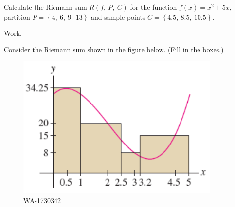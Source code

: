 \documentclass[12pt,addpoints, answers, fleqn]{exam}
\begin{document}
\begin{teacher}
\begin{questions}
\question 	%

Calculate the Riemann sum $R\left( f, \ P, \ C \right)$ for the function $f\left(x\right) = x^2 + 5x$, partition $P = \left\{ 4, \ 6, \ 9, \ 13 \right\}$ and sample points $C = \left\{ 4.5, \ 8.5, \ 10.5 \right\}$.


\begin{solution}
Work.
\end{solution}


\question 	%

Consider the Riemann sum shown in the figure below. (Fill in the boxes.)
\begin{figure}[htbp] %
   \centering
   \includegraphics[width=4in]{./graphics/1730342.pdf} 
   \caption{WA-1730342}
   \label{fig:1730342}
\end{figure}





\end{questions}
\end{teacher}
\end{document}
